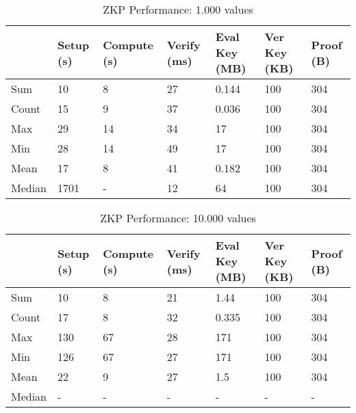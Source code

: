 \begin{table}[!htb]
\small
\centering
\captionsetup{format=hang, justification=centering}
\caption{ZKP Performance: 1.000 values}
\begin{tabular}{|l|l|l|l|l|l|l|}
\hline
 & Setup (s) & Compute (s) & Verify (ms) & Eval Key (MB) & Ver Key (KB) & Proof (B)  \\ \hline
 Sum & 10 & 8 & 27 & 0.144 & 100 & 304 \\ \hline
 Count & 15 & 9 & 37 & 0.036 & 100 & 304 \\ \hline
 Max & 29 & 14 & 34 & 17 & 100 & 304 \\ \hline
 Min & 28 & 14 & 49 & 17 & 100 & 304 \\ \hline
 Mean & 17 & 8 & 41 & 0.182 & 100 & 304 \\ \hline
 Median & 1701 & - & 12 & 64 & 100 & 304 \\ \hline
\end{tabular}
\label{table:zkp_02}
\end{table}

\begin{table}[!htb]
\small
\centering
\captionsetup{format=hang, justification=centering}
\caption{ZKP Performance: 10.000 values}
\begin{tabular}{|l|l|l|l|l|l|l|}
\hline
 & Setup (s) & Compute (s) & Verify (ms) & Eval Key (MB) & Ver Key (KB) & Proof (B)  \\ \hline
 Sum & 10 & 8 & 21 & 1.44 & 100 & 304 \\ \hline
 Count & 17 & 8 & 32 & 0.335 & 100 & 304 \\ \hline
 Max & 130 & 67 & 28 & 171 & 100 & 304 \\ \hline
 Min & 126 & 67 & 27 & 171 & 100 & 304 \\ \hline
 Mean & 22 & 9 & 27 & 1.5 & 100 & 304 \\ \hline
 Median & - & - & - & - & - & - \\ \hline
\end{tabular}
\label{table:zkp_03}
\end{table}
